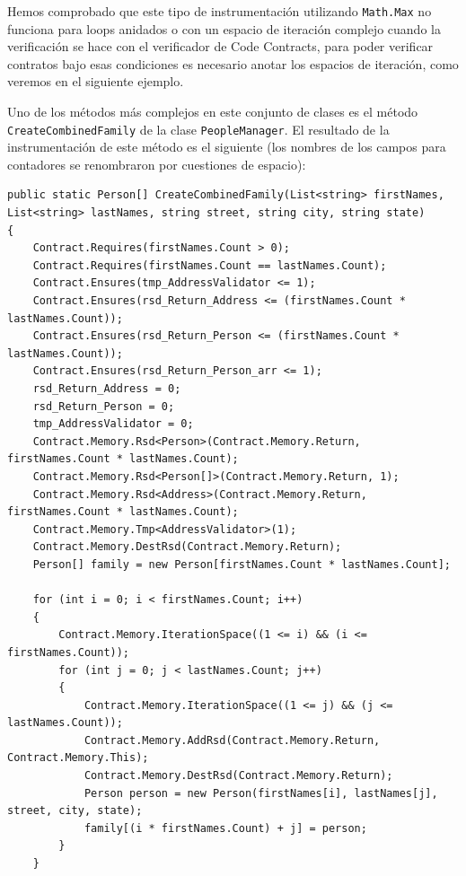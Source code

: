 \documentclass[12pt,a4paper]{article}
\newcommand\mono[1]{\texttt{#1}}
\begin{document}
			Hemos comprobado que este tipo de instrumentación utilizando \mono{Math.Max} no funciona para loops anidados o con un espacio de iteración complejo cuando la verificación se hace con el verificador de Code Contracts, para poder verificar contratos bajo esas condiciones es necesario anotar los espacios de iteración, como veremos en el siguiente ejemplo.

			Uno de los métodos más complejos en este conjunto de clases es el método\\ \mono{CreateCombinedFamily} de la clase \mono{PeopleManager}. El resultado de la instrumentación de este método es el siguiente (los nombres de los campos para contadores se renombraron por cuestiones de espacio):

			\vspace{15pt}
			\begin{scriptsize}
			\begin{lstlisting}[caption=Método \mono{CreateCombinedFamily} instrumentado]
public static Person[] CreateCombinedFamily(List<string> firstNames, List<string> lastNames, string street, string city, string state)
{ 
    Contract.Requires(firstNames.Count > 0);
    Contract.Requires(firstNames.Count == lastNames.Count);
    Contract.Ensures(tmp_AddressValidator <= 1);
    Contract.Ensures(rsd_Return_Address <= (firstNames.Count * lastNames.Count));
    Contract.Ensures(rsd_Return_Person <= (firstNames.Count * lastNames.Count));
    Contract.Ensures(rsd_Return_Person_arr <= 1);
    rsd_Return_Address = 0;
    rsd_Return_Person = 0;
    tmp_AddressValidator = 0;
    Contract.Memory.Rsd<Person>(Contract.Memory.Return, firstNames.Count * lastNames.Count);
    Contract.Memory.Rsd<Person[]>(Contract.Memory.Return, 1);
    Contract.Memory.Rsd<Address>(Contract.Memory.Return, firstNames.Count * lastNames.Count);
    Contract.Memory.Tmp<AddressValidator>(1);
    Contract.Memory.DestRsd(Contract.Memory.Return);
    Person[] family = new Person[firstNames.Count * lastNames.Count];
    
    for (int i = 0; i < firstNames.Count; i++)
    {
        Contract.Memory.IterationSpace((1 <= i) && (i <= firstNames.Count));
        for (int j = 0; j < lastNames.Count; j++)
        {
            Contract.Memory.IterationSpace((1 <= j) && (j <= lastNames.Count));
            Contract.Memory.AddRsd(Contract.Memory.Return, Contract.Memory.This);
            Contract.Memory.DestRsd(Contract.Memory.Return);
            Person person = new Person(firstNames[i], lastNames[j], street, city, state);
            family[(i * firstNames.Count) + j] = person;
        }
    }
    

\end{lstlisting}
\end{scriptsize}
\end{document}

